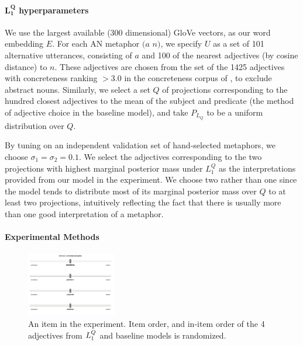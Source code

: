 \documentclass[9pt,twocolumn,twoside,lineno]{pnas-new}
\newcommand{\Listener}{L}
\newcommand{\QLONE}{\Listener_{{1}}^{{Q}}}
\begin{document}
{	%
	\paragraph{$\mathbf{\QLONE}$ hyperparameters}

		We use the largest available (300 dimensional) GloVe vectors, as our word embedding $E$. For each AN metaphor $(a$ $n)$, we specify $U$ as a set of 101 alternative utterances, consisting of $a$ and 100 of the nearest adjectives (by cosine distance) to $n$. These adjectives are chosen from the set of the 1425 adjectives with concreteness ranking $>3.0$ in the concreteness corpus of \cite{brysbaert2014concreteness}, to exclude abstract nouns.
		Similarly, we select a set $Q$ of projections corresponding to the hundred closest adjectives to the mean of the subject and predicate (the method of adjective choice in the baseline model), and take $P_{L_Q}$ to be a uniform distribution over $Q$. 

		By tuning on an independent validation set of hand-selected metaphors, we choose $\sigma_1=\sigma_2=0.1$. We select the adjectives corresponding to the two projections with highest marginal posterior mass under $\QLONE$ as the interpretations provided from our model in the experiment. We choose two rather than one since the model tends to distribute most of its marginal posterior mass over $Q$ to at least two projections, intuitively reflecting the fact that there is usually more than one good interpretation of a metaphor.

\paragraph{Experimental Methods}

\begin{figure}
\centering
\includegraphics[width=0.35\textwidth]{images/slide.png}
\caption{An item in the experiment. Item order, and in-item order of the 4 adjectives from $\protect\QLONE$ and baseline models is randomized.}
\label{fig:slide}
\end{figure}

}
\end{document}
